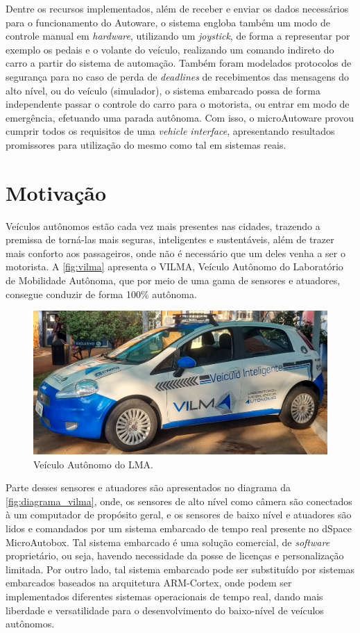 Dentre os recursos implementados, além de receber e enviar os dados necessários para o funcionamento do Autoware, o sistema engloba também um modo de controle manual em \textit{hardware}, utilizando um \textit{joystick}, de forma a representar por exemplo os pedais e o volante do veículo, realizando um comando indireto do carro a partir do sistema de automação. Também foram modelados protocolos de segurança para no caso de perda de \textit{deadlines} de recebimentos das mensagens do alto nível, ou do veículo (simulador), o sistema embarcado possa de forma independente passar o controle do carro para o motorista, ou entrar em modo de emergência, efetuando uma parada autônoma. Com isso, o microAutoware provou cumprir todos os requisitos de uma \textit{vehicle interface}, apresentando resultados promissores para utilização do mesmo como tal em sistemas reais.

\clearpage

\section{Motivação}

Veículos autônomos estão cada vez mais presentes nas cidades, trazendo a premissa de torná-las mais seguras, inteligentes e sustentáveis, além de trazer mais conforto aos passageiros, onde não é necessário que um deles venha a ser o motorista. A \autoref{fig:vilma} apresenta o VILMA, Veículo Autônomo do Laboratório de Mobilidade Autônoma, que por meio de uma gama de sensores e atuadores, consegue conduzir de forma 100\% autônoma.


\begin{figure}[H]
	\centering
	\includegraphics[width=0.5\linewidth]{img/vilma}
	\caption{Veículo Autônomo do LMA.}
	\label{fig:vilma}
\end{figure}

Parte desses sensores e atuadores são apresentados no diagrama da \autoref{fig:diagrama_vilma}, onde, os sensores de alto nível como câmera são conectados à um computador de propósito geral, e os sensores de baixo nível e atuadores são lidos e comandados por um sistema embarcado de tempo real presente no dSpace MicroAutobox. Tal sistema embarcado é uma solução comercial, de \textit{software} proprietário, ou seja, havendo necessidade da posse de licenças e personalização limitada. Por outro lado, tal sistema embarcado pode ser substituído por sistemas embarcados baseados na arquitetura ARM-Cortex, onde podem ser implementados diferentes sistemas operacionais de tempo real, dando mais liberdade e versatilidade para o desenvolvimento do baixo-nível de veículos autônomos.


